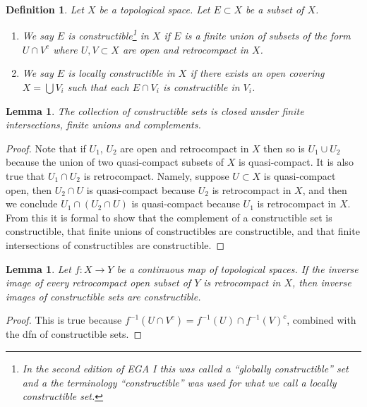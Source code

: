 \documentclass{ujarticle}
\newtheorem{dfn}[thm]{Definition}
\newtheorem{lem}[thm]{Lemma}
\begin{document}
\begin{dfn}
\label{dfn-constructible}
Let $X$ be a topological space. Let $E \subset X$ be a subset of $X$.
\begin{enumerate}
\item We say $E$ is {\it constructible}\footnote{In the second edition
of EGA I \cite{EGA1-second} this was called a ``globally constructible''
set and a the terminology ``constructible'' was used for what we call a locally
constructible set.}
in $X$ if $E$ is a finite union
of subsets of the form $U \cap V^c$ where $U, V \subset X$ are open and
retrocompact in $X$.
\item We say $E$ is {\it locally constructible} in $X$ if there exists an open
covering $X = \bigcup V_i$ such that each $E \cap V_i$ is constructible
in $V_i$.
\end{enumerate}
\end{dfn}

\begin{lem}
\label{lem-constructible}
The collection of constructible sets is closed unsder
finite intersections, finite unions and complements.
\end{lem}

\begin{proof}
Note that if $U_1$, $U_2$ are open and retrocompact in $X$
then so is $U_1 \cup U_2$ because the union of two quasi-compact
subsets of $X$ is quasi-compact. It is also true that
$U_1 \cap U_2$ is retrocompact. Namely, suppose $U \subset X$
is quasi-compact open, then $U_2 \cap U$ is quasi-compact because
$U_2$ is retrocompact in $X$, and then we conclude
$U_1 \cap (U_2 \cap U)$ is quasi-compact because $U_1$ is
retrocompact in $X$. From this it is formal to show that
the complement of a constructible set is constructible,
that finite unions of constructibles are constructible, and
that finite intersections of constructibles are constructible.
\end{proof}

\begin{lem}
\label{lem-inverse-images-constructibles}
Let $f : X \to Y$ be a continuous map of topological spaces.
If the inverse image of every retrocompact open subset of $Y$
is retrocompact in $X$, then inverse images of constructible
sets are constructible.
\end{lem}

\begin{proof}
This is true because $f^{-1}(U \cap V^c) = f^{-1}(U) \cap f^{-1}(V)^c$,
combined with the dfn of constructible sets.
\end{proof}
\end{document}
